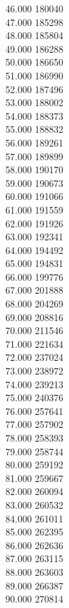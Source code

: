 { 46.000	180040 \\
 47.000	185298 \\
 48.000	185804 \\
 49.000	186288 \\
 50.000	186650 \\
 51.000	186990 \\
 52.000	187496 \\
 53.000	188002 \\
 54.000	188373 \\
 55.000	188832 \\
 56.000	189261 \\
 57.000	189899 \\
 58.000	190170 \\
 59.000	190673 \\
 60.000	191066 \\
 61.000	191559 \\
 62.000	191926 \\
 63.000	192341 \\
 64.000	194492 \\
 65.000	194831 \\
 66.000	199776 \\
 67.000	201888 \\
 68.000	204269 \\
 69.000	208816 \\
 70.000	211546 \\
 71.000	221634 \\
 72.000	237024 \\
 73.000	238972 \\
 74.000	239213 \\
 75.000	240376 \\
 76.000	257641 \\
 77.000	257902 \\
 78.000	258393 \\
 79.000	258744 \\
 80.000	259192 \\
 81.000	259667 \\
 82.000	260094 \\
 83.000	260532 \\
 84.000	261011 \\
 85.000	262395 \\
 86.000	262636 \\
 87.000	263115 \\
 88.000	263603 \\
 89.000	266387 \\
 90.000	270814 \\
}
